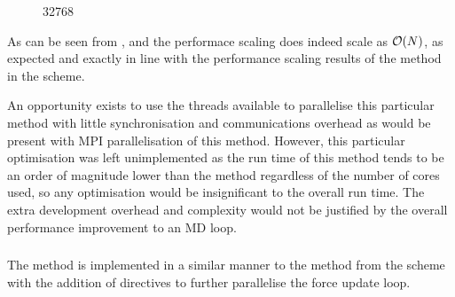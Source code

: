 \begin{figure}[!h]
    
    \caption{
        \vOneSRTimeCaption
            {\sharedandreplicateddata{}}
            {\individualoperation{}}
            {32768}
    }
    \label{fig:v1_shared_and_replicated_individual_operation_32768_time}
\end  {figure}

\vOneSRTimeExplanation
    {}
    {}
    {}
    {\individualoperation{}}
    {\replicateddata{}}


%
As can be seen from 
,
 and
the performace scaling does indeed scale as $\mathcal{O}{\left({ N }\right)}$, as expected
and exactly in line with the performance scaling results of the
\individualoperation{} method in the \replicateddata{} scheme.

An opportunity exists to use the \openmp{} threads available to
parallelise this particular method with little synchronisation
and communications overhead as would be present with MPI
parallelisation of this method.
%
However, this particular optimisation was left unimplemented as
the run time of this method tends to be an order of magnitude
lower than the \pairoperation{} method regardless of the
number of cores used, so any optimisation
would be insignificant to the overall run time.
%
The extra development overhead and complexity would not be justified by the
overall performance improvement to an MD loop.



\subsubsection{\pairoperation{}}

The \pairoperation{} method is implemented in a similar manner to the
\pairoperation{} method from the \replicateddata{} scheme with the
addition of \openmp{} directives to further parallelise the
force update loop.

%

